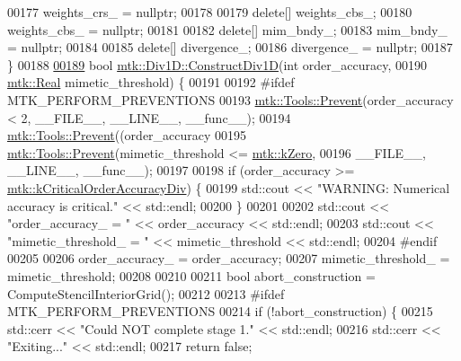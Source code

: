 \begin{DoxyCode}
00177   weights\_crs\_ = \textcolor{keyword}{nullptr};
00178 
00179   \textcolor{keyword}{delete}[] weights\_cbs\_;
00180   weights\_cbs\_ = \textcolor{keyword}{nullptr};
00181 
00182   \textcolor{keyword}{delete}[] mim\_bndy\_;
00183   mim\_bndy\_ = \textcolor{keyword}{nullptr};
00184 
00185   \textcolor{keyword}{delete}[] divergence\_;
00186   divergence\_ = \textcolor{keyword}{nullptr};
00187 \}
00188 
\hypertarget{mtk__div__1d_8cc_source_l00189}{}\hyperlink{classmtk_1_1Div1D_a52fcd1542f11e606e36bd188e48bfdf7}{00189} \textcolor{keywordtype}{bool} \hyperlink{classmtk_1_1Div1D_a52fcd1542f11e606e36bd188e48bfdf7}{mtk::Div1D::ConstructDiv1D}(\textcolor{keywordtype}{int} order\_accuracy,
00190                                 \hyperlink{group__c01-roots_gac080bbbf5cbb5502c9f00405f894857d}{mtk::Real} mimetic\_threshold) \{
00191 
00192 \textcolor{preprocessor}{  #ifdef MTK\_PERFORM\_PREVENTIONS}
00193   \hyperlink{classmtk_1_1Tools_a332324c6f25e66be9dff48c5987a3b9f}{mtk::Tools::Prevent}(order\_accuracy < 2, \_\_FILE\_\_, \_\_LINE\_\_, \_\_func\_\_);
00194   \hyperlink{classmtk_1_1Tools_a332324c6f25e66be9dff48c5987a3b9f}{mtk::Tools::Prevent}((order\_accuracy%
00195   \hyperlink{classmtk_1_1Tools_a332324c6f25e66be9dff48c5987a3b9f}{mtk::Tools::Prevent}(mimetic\_threshold <= \hyperlink{group__c01-roots_ga59a451a5fae30d59649bcda274fea271}{mtk::kZero},
00196                       \_\_FILE\_\_, \_\_LINE\_\_, \_\_func\_\_);
00197 
00198   \textcolor{keywordflow}{if} (order\_accuracy >= \hyperlink{group__c01-roots_ga0898eef2108473e44a5223932d571c31}{mtk::kCriticalOrderAccuracyDiv}) \{
00199     std::cout << \textcolor{stringliteral}{"WARNING: Numerical accuracy is critical."} << std::endl;
00200   \}
00201 
00202   std::cout << \textcolor{stringliteral}{"order\_accuracy\_ = "} << order\_accuracy << std::endl;
00203   std::cout << \textcolor{stringliteral}{"mimetic\_threshold\_ = "} << mimetic\_threshold << std::endl;
00204 \textcolor{preprocessor}{  #endif}
00205 
00206   order\_accuracy\_ = order\_accuracy;
00207   mimetic\_threshold\_ = mimetic\_threshold;
00208 
00210 
00211   \textcolor{keywordtype}{bool} abort\_construction = ComputeStencilInteriorGrid();
00212 
00213 \textcolor{preprocessor}{  #ifdef MTK\_PERFORM\_PREVENTIONS}
00214   \textcolor{keywordflow}{if} (!abort\_construction) \{
00215     std::cerr << \textcolor{stringliteral}{"Could NOT complete stage 1."} << std::endl;
00216     std::cerr << \textcolor{stringliteral}{"Exiting..."} << std::endl;
00217     \textcolor{keywordflow}{return} \textcolor{keyword}{false};

\end{DoxyCode}
